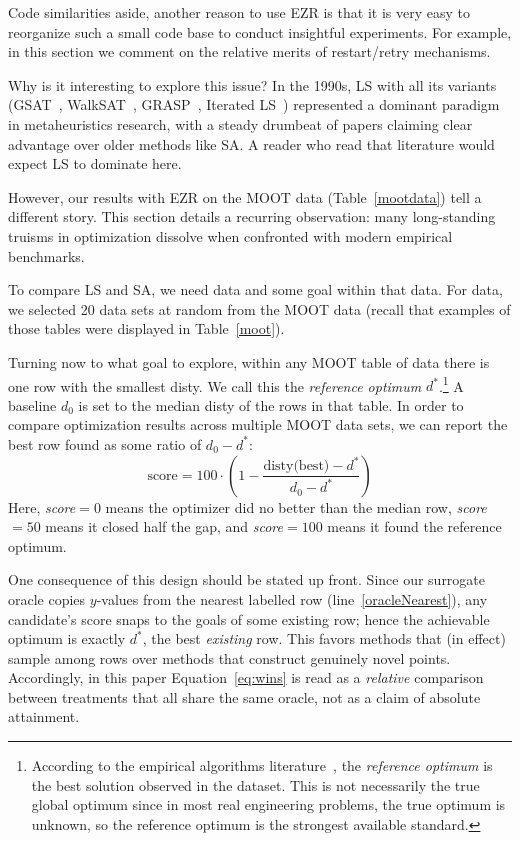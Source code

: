 \documentclass[AMA,STIX2COL]{WileyNJDv5}
\begin{document}
Code similarities aside, another reason to use EZR is that it is
very easy to reorganize such a small code base to conduct insightful
experiments. For example, in this section we comment
on the relative merits of restart/retry mechanisms.

Why is it interesting to explore this issue?
In the 1990s, LS with all its variants (GSAT~\cite{gsat},
WalkSAT~\cite{walksat}, GRASP~\cite{grasp}, Iterated LS~\cite{ils})
represented a dominant paradigm in metaheuristics research, with
a steady drumbeat of papers claiming clear advantage over older
methods like SA. A reader who
read that literature would expect LS to dominate here.

However, our results with EZR on the MOOT data
(Table~\ref{mootdata}) tell a different story. This section
details a recurring observation: many long-standing truisms
in optimization dissolve when confronted with modern
empirical benchmarks.

To compare LS and SA, we need data and some goal
within that data.
For data, we selected 20 data sets at random from the MOOT data
 (recall
that examples of those tables were displayed in
Table~\ref{moot}).

Turning now to what goal to explore, within any MOOT table
of data there is one row with
the smallest \textsf{disty}. We call this the {\em reference
optimum} $d^*$.\footnote{According to the
empirical algorithms literature~\cite{McGeoch2012,cohen1995empirical},
the
{\em reference optimum} is the best solution observed in the dataset. This is not necessarily the true global optimum
since in most real engineering problems,
the true optimum is unknown, so the reference optimum is the
strongest available standard.} A baseline $d_0$ is set to
the median \textsf{disty} of the rows in that table.
In order to compare optimization results across multiple
MOOT data sets, we can report the best row found as some
ratio of $d_0 - d^*$:
\begin{equation}\label{eq:wins}
  \text{score} = 100 \cdot \left( 1 - \frac{\text{disty(best)} - d^*}{d_0 - d^*} \right)
\end{equation}
Here, {\em score}$=0$ means the optimizer did no better than the
median row, {\em score}$=50$ means it closed half the gap, and
{\em score}$=100$ means it found the reference
optimum.

One consequence of this design should be stated up front.
Since our surrogate oracle copies $y$-values from the nearest
labelled row (line~\ref{oracleNearest}), any candidate's score
snaps to the goals of some existing row; hence the achievable
optimum is exactly $d^*$, the best {\em existing} row. This
favors methods that (in effect) sample among rows over methods
that construct genuinely novel points. Accordingly, in this
paper Equation~\ref{eq:wins} is read as a {\em relative}
comparison between treatments that all share the same oracle,
not as a claim of absolute attainment.
\end{document}
